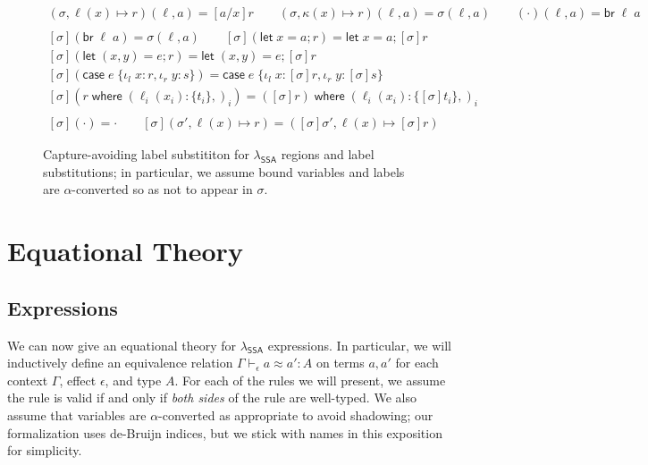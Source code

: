 \documentclass[acmsmall,screen,review]{acmart}
\newcommand{\ms}[1]{\ensuremath{\mathsf{#1}}}
\newcommand{\lto}{:}
\newcommand{\linl}[1]{\iota_l\;{#1}}
\newcommand{\linr}[1]{\iota_r\;{#1}}
\newcommand{\letstmt}[3]{\ensuremath{\ms{let}\;#1 = #2; #3}}
\newcommand{\brb}[2]{\ms{br}\;#1\;#2}
\newcommand{\casestmt}[5]{\ms{case}\;#1\;\{\linl{#2} \lto #3, \linr{#4} \lto #5\}}
\newcommand{\where}[2]{#1\;\ms{where}\;#2}
\newcommand{\wbranch}[3]{#1(#2) \lto \{#3\}}
\newcommand{\teqv}{\approx}
\newcommand{\tmeq}[5]{#1 \vdash_{#2} #3 \teqv #4 : {#5}}
\newcommand{\isotopessa}{\(\lambda_{\ms{SSA}}\)}
\begin{document}
\begin{figure}
  \begin{gather*}
    (\sigma, \ell(x) \mapsto r)(\ell, a) = [a/x]r \qquad
    (\sigma, \kappa(x) \mapsto r)(\ell, a) = \sigma(\ell, a) \qquad
    (\cdot)(\ell, a) = \brb{\ell}{a}
    \\ \\
    [\sigma](\brb{\ell}{a}) = \sigma(\ell, a) \qquad
    [\sigma](\letstmt{x}{a}{r}) = \letstmt{x}{a}{[\sigma]r} \\
    [\sigma](\letstmt{(x, y)}{e}{r}) = \letstmt{(x, y)}{e}{[\sigma]r} \\
    [\sigma](\casestmt{e}{x}{r}{y}{s}) = \casestmt{e}{x}{[\sigma]r}{y}{[\sigma]s} \\
    [\sigma](\where{r}{(\wbranch{\ell_i}{x_i}{t_i},)_i}) =
    \where{([\sigma]r)}{(\wbranch{\ell_i}{x_i}{[\sigma]t_i},)_i} 
    \\ \\
    [\sigma](\cdot) = \cdot \qquad
    [\sigma](\sigma', \ell(x) \mapsto r) 
    = ([\sigma]\sigma', \ell(x) \mapsto [\sigma]r)
  \end{gather*}
  \caption{ 
    Capture-avoiding label substititon for \isotopessa{} regions and label substitutions; in 
    particular, we assume bound variables and labels are $\alpha$-converted  so as not to appear in 
    $\sigma$. 
  } 
  \Description{}
  \label{fig:ssa-label-subst-def}
\end{figure}

\section{Equational Theory}

\label{sec:equations}

\subsection{Expressions}

We can now give an equational theory for \isotopessa{} expressions. In particular,
we will inductively define an equivalence relation
$
\tmeq{\Gamma}{\epsilon}{a}{a'}{A}
$
on terms $a, a'$ for each context $\Gamma$, effect $\epsilon$, and type $A$. For each of the rules
we will present, we assume the rule is valid if and only if \emph{both sides} of the rule are
well-typed. We also assume that variables are $\alpha$-converted as appropriate to avoid shadowing;
our formalization uses de-Bruijn indices, but we stick with names in this exposition for simplicity.
\end{document}
